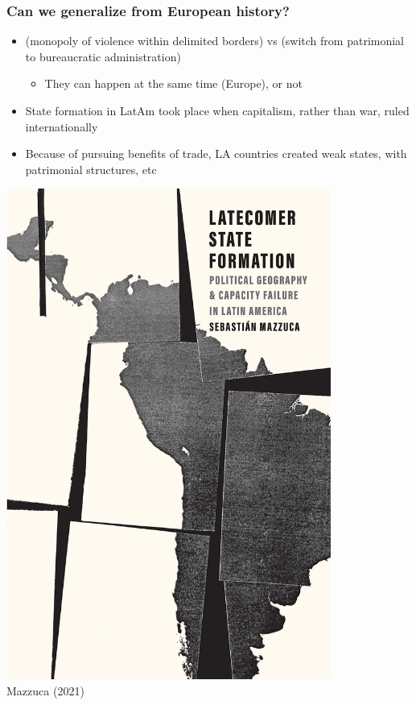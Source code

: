 \documentclass[aspectratio=43, handout]{beamer}
\begin{document}
\begin{frame}
\frametitle{Can we generalize from European history?}
\centering

\begin{minipage}{0.6\textwidth}\centering
  \begin{itemize}
    \item<2->  (monopoly of violence within delimited borders) vs  (switch from patrimonial to bureaucratic administration)
    \begin{itemize}
      \item They can happen at the same time (Europe), or not
    \end{itemize}
    \item<3-> State formation in LatAm took place when capitalism, rather than war, ruled internationally
    \item<3-> Because of pursuing benefits of trade, LA countries created weak states, with patrimonial structures, etc
  \end{itemize}
\end{minipage}\hfill
\begin{minipage}{0.4\textwidth}\centering
  \includegraphics[width = 0.8\textwidth]{img/mazzuca_book}\\
  {\small Mazzuca (2021)}
\end{minipage}

\end{frame}
\end{document}
